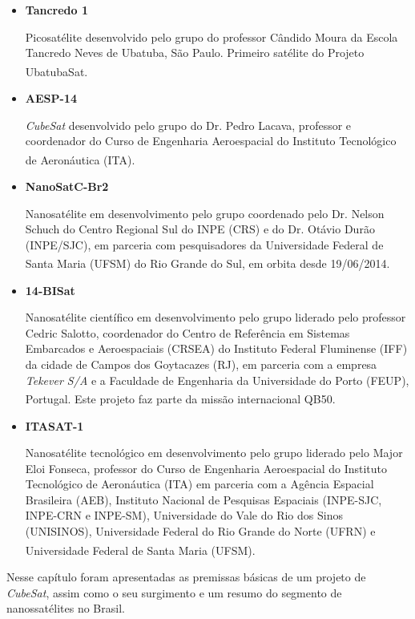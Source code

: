 \documentclass[
	12pt,				%
	openright,			%
	oneside,			%
	a4paper,			%
	english,			%
	french,				%
	spanish,			%
	brazil,				%
	oldfontcommands
	]{abntex2}
\begin{document}
	\begin{itemize}
		\item \textbf{Tancredo 1}
		
			Picosatélite desenvolvido pelo grupo do professor Cândido Moura da Escola Tancredo Neves de Ubatuba, São Paulo. Primeiro satélite do Projeto UbatubaSat.\textsuperscript{\cite{UbatubaSat}}
			
		\item \textbf{AESP-14}		
		
			\textit{CubeSat} desenvolvido pelo grupo do Dr. Pedro Lacava, professor e coordenador do Curso de Engenharia Aeroespacial do Instituto Tecnológico de Aeronáutica (ITA).\textsuperscript{\cite{AESP14}}
			
		\item \textbf{NanoSatC-Br2}
		
			Nanosatélite em desenvolvimento pelo grupo coordenado pelo Dr. Nelson Schuch do Centro Regional Sul do INPE (CRS) e do Dr. Otávio Durão (INPE/SJC), em parceria com pesquisadores da Universidade Federal de Santa Maria (UFSM) do Rio Grande do Sul, em orbita desde 19/06/2014.\textsuperscript{\cite{INPE}}

		\item \textbf{14-BISat}

			Nanosatélite científico em desenvolvimento pelo grupo liderado pelo professor Cedric Salotto, coordenador do Centro de Referência em Sistemas Embarcados e Aeroespaciais (CRSEA) do Instituto Federal Fluminense (IFF) da cidade de Campos dos Goytacazes (RJ), em parceria com a empresa \textit{Tekever S/A} e a Faculdade de Engenharia da Universidade do Porto (FEUP), Portugal. Este projeto faz parte da missão internacional QB50.\textsuperscript{\cite{IFF}}
			
		\item \textbf{ITASAT-1}	

			Nanosatélite tecnológico em desenvolvimento pelo grupo liderado pelo Major Eloi Fonseca, professor do Curso de Engenharia Aeroespacial do Instituto Tecnológico de Aeronáutica (ITA) em parceria com a Agência Espacial Brasileira (AEB), Instituto Nacional de Pesquisas Espaciais (INPE-SJC, INPE-CRN e INPE-SM), Universidade do Vale do Rio dos Sinos (UNISINOS), Universidade Federal do Rio Grande do Norte (UFRN) e Universidade Federal de Santa Maria (UFSM).\textsuperscript{\cite{ITASAT}}	
			
	\end{itemize}

	Nesse capítulo foram apresentadas as premissas básicas de um projeto de \textit{CubeSat}, assim como o seu surgimento e  um resumo do segmento de nanossatélites no Brasil.
\end{document}
